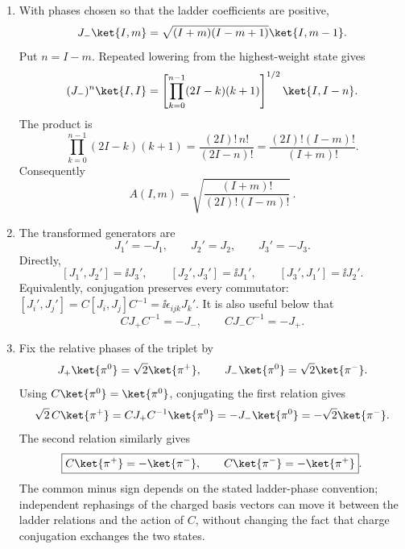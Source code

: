 \begin{enumerate}
\begin{enumerate}
\item[(b)] With phases chosen so that the ladder coefficients are
positive,
\[
 J_-\ket{I,m}
 =\sqrt{(I+m)(I-m+1)}\ket{I,m-1}.
\]
Put \(n=I-m\).  Repeated lowering from the highest-weight state gives
\[
 (J_-)^n\ket{I,I}
 =\left[\prod_{k=0}^{n-1}(2I-k)(k+1)\right]^{1/2}
 \ket{I,I-n}.
\]
The product is
\[
 \prod_{k=0}^{n-1}(2I-k)(k+1)
 =\frac{(2I)!\,n!}{(2I-n)!}
 =\frac{(2I)!(I-m)!}{(I+m)!}.
\]
Consequently
\[
 \boxed{A(I,m)=
 \sqrt{\frac{(I+m)!}{(2I)!(I-m)!}}}\,.
\]

\item[(c)] The transformed generators are
\[
 J_1'=-J_1,\qquad J_2'=J_2,\qquad J_3'=-J_3.
\]
Directly,
\[
 [J_1',J_2']=\ii J_3',\qquad
 [J_2',J_3']=\ii J_1',\qquad
 [J_3',J_1']=\ii J_2'.
\]
Equivalently, conjugation preserves every commutator:
\([J_i',J_j']=C[J_i,J_j]C^{-1}=\ii\epsilon_{ijk}J_k'\).
It is also useful below that
\[
 CJ_+C^{-1}=-J_-,\qquad CJ_-C^{-1}=-J_+.
\]

\item[(d)] Fix the relative phases of the triplet by
\[
 J_+\ket{\pi^0}=\sqrt2\ket{\pi^+},
 \qquad
 J_-\ket{\pi^0}=\sqrt2\ket{\pi^-}.
\]
Using \(C\ket{\pi^0}=\ket{\pi^0}\), conjugating the first relation gives
\[
 \sqrt2\,C\ket{\pi^+}
 =CJ_+C^{-1}\ket{\pi^0}
 =-J_-\ket{\pi^0}
 =-\sqrt2\ket{\pi^-}.
\]
The second relation similarly gives
\[
 \boxed{C\ket{\pi^+}=-\ket{\pi^-},\qquad
 C\ket{\pi^-}=-\ket{\pi^+}}.
\]
The common minus sign depends on the stated ladder-phase convention;
independent rephasings of the charged basis vectors can move it between
the ladder relations and the action of \(C\), without changing the fact
that charge conjugation exchanges the two states.
\end{enumerate}


\end{enumerate}

